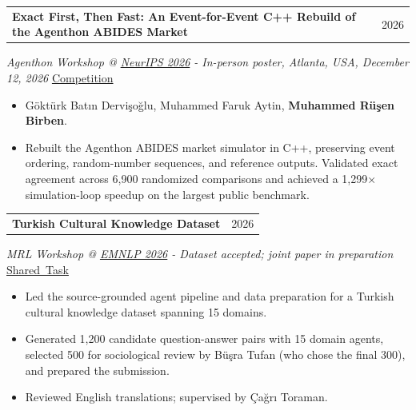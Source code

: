 \documentclass[11pt,a4paper]{article}
\makeatletter
\newcommand{\cvlink}[2]{\href{#1}{\textcolor{linkblue}{#2}}}
\newcommand{\cvheading}[2]{%
  \begin{tabularx}{\linewidth}{@{}>{\raggedright\arraybackslash}X@{\hspace{10pt}}r@{}}%
  \textbf{#1} & {\small\color{muted}#2}\\
  \end{tabularx}\par\nobreak
}
\newenvironment{cvpoints}{\begin{itemize}[leftmargin=12pt,itemsep=2pt,topsep=2pt,parsep=0pt]\small}{\end{itemize}}
\makeatother
\begin{document}
\begin{minipage}{\linewidth}\raggedright
\cvheading{Exact First, Then Fast: An Event-for-Event C++ Rebuild of the Agenthon ABIDES Market}{2026}
{\small{}\itshape{}\color{muted}Agenthon Workshop @ \cvlink{https://neurips.cc/Conferences/2026}{NeurIPS 2026} - In-person poster, Atlanta, USA, December 12, 2026}\hfill{\small{}%
\mbox{\cvlink{https://www.agenthon.net/}{Competition}}%
}\par\vspace{2pt}
\begin{cvpoints}
\item Göktürk Batın Dervişoğlu, Muhammed Faruk Aytin, \textbf{Muhammed Rüşen Birben}.
\item Rebuilt the Agenthon ABIDES market simulator in C++, preserving event ordering, random-number sequences, and reference outputs. Validated exact agreement across 6,900 randomized comparisons and achieved a 1,299× simulation-loop speedup on the largest public benchmark.
\end{cvpoints}
\end{minipage}\par\vspace{5pt}
\begin{minipage}{\linewidth}\raggedright
\cvheading{Turkish Cultural Knowledge Dataset}{2026}
{\small{}\itshape{}\color{muted}MRL Workshop @ \cvlink{https://2026.emnlp.org/}{EMNLP 2026} - Dataset accepted; joint paper in preparation}\hfill{\small{}%
\mbox{\cvlink{https://mrlbenchmarks.github.io/}{Shared Task}}%
}\par\vspace{2pt}
\begin{cvpoints}
\item Led the source-grounded agent pipeline and data preparation for a Turkish cultural knowledge dataset spanning 15 domains.
\item Generated 1,200 candidate question-answer pairs with 15 domain agents, selected 500 for sociological review by Büşra Tufan (who chose the final 300), and prepared the submission.
\item Reviewed English translations; supervised by Çağrı Toraman.
\end{cvpoints}
\end{minipage}\par\vspace{5pt}
\end{document}
